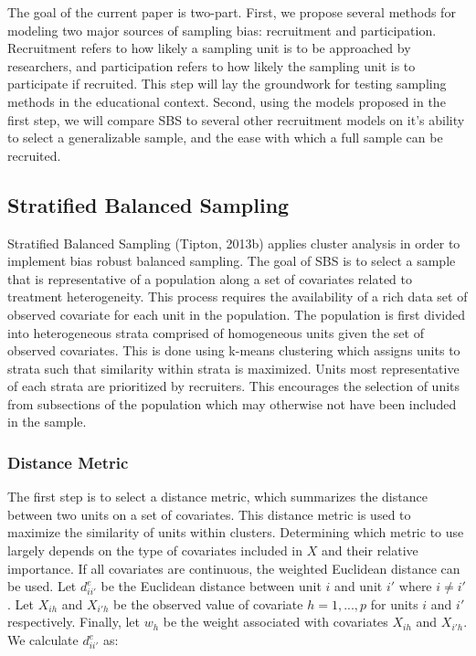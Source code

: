 \documentclass[man,floatsintext]{apa6}
\theoremstyle{definition}
\theoremstyle{definition}
\theoremstyle{definition}
\theoremstyle{remark}
\begin{document}
The goal of the current paper is two-part. First, we propose several
methods for modeling two major sources of sampling bias: recruitment and
participation. Recruitment refers to how likely a sampling unit is to be
approached by researchers, and participation refers to how likely the
sampling unit is to participate if recruited. This step will lay the
groundwork for testing sampling methods in the educational context.
Second, using the models proposed in the first step, we will compare SBS
to several other recruitment models on it's ability to select a
generalizable sample, and the ease with which a full sample can be
recruited.

\hypertarget{stratified-balanced-sampling}{%
\subsection{Stratified Balanced
Sampling}\label{stratified-balanced-sampling}}

Stratified Balanced Sampling (Tipton, 2013b) applies cluster analysis in
order to implement bias robust balanced sampling. The goal of SBS is to
select a sample that is representative of a population along a set of
covariates related to treatment heterogeneity. This process requires the
availability of a rich data set of observed covariate for each unit in
the population. The population is first divided into heterogeneous
strata comprised of homogeneous units given the set of observed
covariates. This is done using k-means clustering which assigns units to
strata such that similarity within strata is maximized. Units most
representative of each strata are prioritized by recruiters. This
encourages the selection of units from subsections of the population
which may otherwise not have been included in the sample.

\hypertarget{distance-metric}{%
\subsubsection{Distance Metric}\label{distance-metric}}

The first step is to select a distance metric, which summarizes the
distance between two units on a set of covariates. This distance metric
is used to maximize the similarity of units within clusters. Determining
which metric to use largely depends on the type of covariates included
in \(X\) and their relative importance. If all covariates are
continuous, the weighted Euclidean distance can be used. Let
\(d^{e}_{ii'}\) be the Euclidean distance between unit \(i\) and unit
\(i'\) where \(i \ne i'\). Let \(X_{ih}\) and \(X_{i'h}\) be the
observed value of covariate \(h = {1, ..., p}\) for units \(i\) and
\(i'\) respectively. Finally, let \(w_h\) be the weight associated with
covariates \(X_{ih}\) and \(X_{i'h}\). We calculate \(d^{e}_{ii'}\) as:
\end{document}
